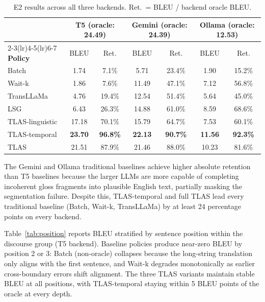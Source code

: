 \documentclass[conference]{IEEEtran}
\begin{document}
\begin{table}[t]
\centering
\caption{E2 results across all three backends. Ret.\ = BLEU / backend oracle BLEU.}
\label{tab:e2_backends}
\small
\begin{tabular}{lcccccc}
\toprule
& \multicolumn{2}{c}{\textbf{T5} (oracle: 24.49)} & \multicolumn{2}{c}{\textbf{Gemini} (oracle: 24.39)} & \multicolumn{2}{c}{\textbf{Ollama} (oracle: 12.53)} \\
\cmidrule(lr){2-3}\cmidrule(lr){4-5}\cmidrule(lr){6-7}
\textbf{Policy} & BLEU & Ret. & BLEU & Ret. & BLEU & Ret. \\
\midrule
Batch           &  1.74 &  7.1\% &  5.71 & 23.4\% &  1.90 & 15.2\% \\
Wait-k          &  1.86 &  7.6\% & 11.49 & 47.1\% &  7.12 & 56.8\% \\
TransLLaMa      &  4.76 & 19.4\% & 12.54 & 51.4\% &  5.64 & 45.0\% \\
\midrule
LSG             &  6.43 & 26.3\% & 14.88 & 61.0\% &  8.59 & 68.6\% \\
TLAS-linguistic & 17.18 & 70.1\% & 15.79 & 64.7\% &  7.53 & 60.1\% \\
TLAS-temporal   & \textbf{23.70} & \textbf{96.8\%} & \textbf{22.13} & \textbf{90.7\%} & \textbf{11.56} & \textbf{92.3\%} \\
TLAS            & 21.51 & 87.9\% & 21.46 & 88.0\% & 10.23 & 81.6\% \\
\bottomrule
\end{tabular}
\end{table}

The Gemini and Ollama traditional baselines achieve higher absolute retention than T5 baselines because the larger LLMs are more capable of completing incoherent gloss fragments into plausible English text, partially masking the segmentation failure. Despite this, TLAS-temporal and full TLAS lead every traditional baseline (Batch, Wait-k, TransLLaMa) by at least 24 percentage points on every backend.

Table~\ref{tab:position} reports BLEU stratified by sentence position within the discourse group (T5 backend). Baseline policies produce near-zero BLEU by position 2 or 3: Batch (non-oracle) collapses because the long-string translation only aligns with the first sentence, and Wait-k degrades monotonically as earlier cross-boundary errors shift alignment. The three TLAS variants maintain stable BLEU at all positions, with TLAS-temporal staying within 5 BLEU points of the oracle at every depth.
\end{document}
